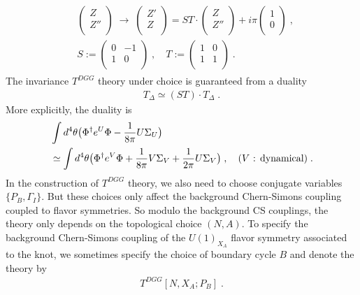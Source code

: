 \documentclass[a4paper,11pt]{article}
\begin{document}
\begin{align}
\begin{split}
 &\left( {\begin{array}{c}
   Z  \\
   Z''  \\
  \end{array} } \right) \; \rightarrow \;  \left( {\begin{array}{c}
   Z'  \\
   Z  \\
  \end{array} } \right)  = ST\cdot  \left( {\begin{array}{c}
   Z  \\
   Z''  \\
  \end{array} } \right) +  i \pi \left( {\begin{array}{c}
   1 \\
   0  \\
  \end{array} } \right)\;,
 \\
 & S := \left( {\begin{array}{cc}
   0 & -1 \\
   1 & 0 \\
  \end{array} } \right)\;, \quad 
  T := \left( {\begin{array}{cc}
   1 & 0 \\
   1 & 1 \\
  \end{array} } \right)\;.
  \end{split}
\end{align}
%
The invariance $T^{DGG}$ theory under choice is guaranteed from a duality 
%
\begin{align}
T_\Delta \simeq (ST) \cdot T_\Delta\;. \label{3d mirror-2}
\end{align}
%
More explicitly, the duality is 
%
\begin{align}
\begin{split}
&\int d^4 \theta \big{(} \Phi^\dagger e^{U} \Phi -\frac{1}{8\pi} U \Sigma_U \big{)}
\\
&\simeq \int d^4 \theta  \big{(}\Phi^\dagger e^{V} \Phi + \frac{1}{8\pi} V \Sigma_V + \frac{1}{2\pi} U \Sigma_V \big{)} \;, \quad (\textrm{$ V$ : dynamical})\;. \label{T=ST*(T)}
\end{split}
\end{align}
%
In the construction of $T^{DGG}$ theory, we also need to choose conjugate variables $\{ P_B, \Gamma_I\}$. But these choices only affect the background Chern-Simons coupling coupled to flavor symmetries. So modulo the background CS couplings, the theory only depends on the topological choice $(N,A)$.  To specify the background Chern-Simons coupling of the $U(1)_{X_A}$ flavor symmetry associated to the knot, we sometimes specify the choice of boundary cycle $B$ and denote the theory by 
%
\begin{align}
T^{DGG}[N,X_A ;P_B]\;.
\end{align}
%
\end{document}
